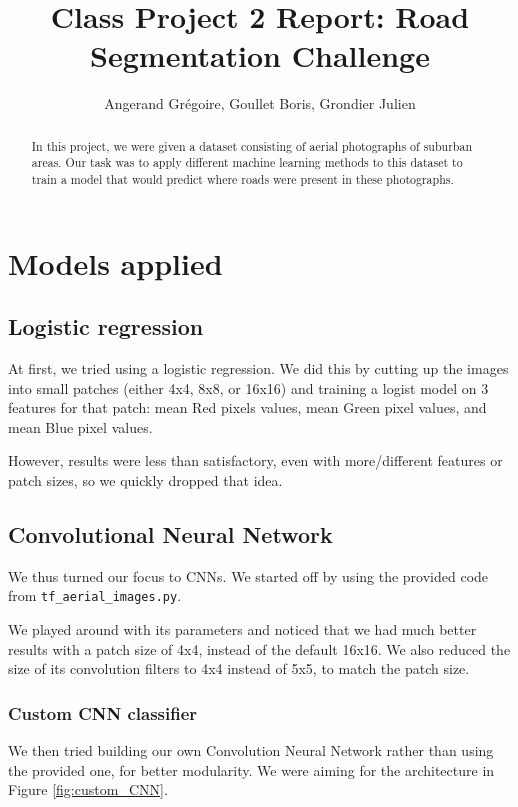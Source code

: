 \documentclass[11pt,conference,compsocconf]{IEEEtran}
\begin{document}
\title{Class Project 2 Report: Road Segmentation Challenge}

\author{
  Angerand Gr\'egoire, Goullet Boris, Grondier Julien 
}

\maketitle

\begin{abstract}
In this project, we were given a dataset consisting of aerial photographs of suburban areas. Our task was to apply different machine learning methods to this dataset to train a model that would predict where roads were present in these photographs.

\end{abstract}


\section{Models applied}

\subsection{Logistic regression}
At first, we tried using a logistic regression. We did this by cutting up the images into small patches (either 4x4, 8x8, or 16x16) and training a logist model on 3 features for that patch: mean Red pixels values, mean Green pixel values, and mean Blue pixel values.

However, results were less than satisfactory, even with more/different features or patch sizes, so we quickly dropped that idea.

\subsection{Convolutional Neural Network}
We thus turned our focus to CNNs. We started off by using the provided code from \texttt{tf\_aerial\_images.py}.

We played around with its parameters and noticed that we had much better results with a patch size of 4x4, instead of the default 16x16. We also reduced the size of its convolution filters to 4x4 instead of 5x5, to match the patch size.

\subsubsection*{Custom CNN classifier}
We then tried building our own Convolution Neural Network rather than using the provided one, for better modularity. We were aiming for the architecture in Figure \ref{fig:custom_CNN}.
\end{document}
